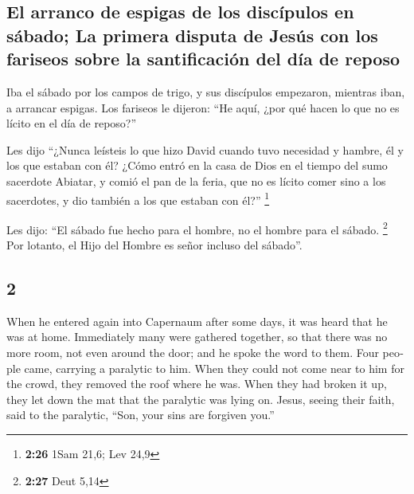 \begin{paracol}{2}
\hypertarget{el-arranco-de-espigas-de-los-discuxedpulos-en-suxe1bado-la-primera-disputa-de-jesuxfas-con-los-fariseos-sobre-la-santificaciuxf3n-del-duxeda-de-reposo}{%
\subsection{El arranco de espigas de los discípulos en sábado; La
primera disputa de Jesús con los fariseos sobre la santificación del día
de
reposo}\label{el-arranco-de-espigas-de-los-discuxedpulos-en-suxe1bado-la-primera-disputa-de-jesuxfas-con-los-fariseos-sobre-la-santificaciuxf3n-del-duxeda-de-reposo}}

 Iba el sábado por los campos de trigo, y sus discípulos
empezaron, mientras iban, a arrancar espigas.  Los
fariseos le dijeron: ``He aquí, ¿por qué hacen lo que no es lícito en el
día de reposo?''

 Les dijo ``¿Nunca leísteis lo que hizo David cuando tuvo
necesidad y hambre, él y los que estaban con él?  ¿Cómo
entró en la casa de Dios en el tiempo del sumo sacerdote Abiatar, y
comió el pan de la feria, que no es lícito comer sino a los sacerdotes,
y dio también a los que estaban con él?'' \footnote{\textbf{2:26} 1Sam
  21,6; Lev 24,9}

 Les dijo: ``El sábado fue hecho para el hombre, no el
hombre para el sábado. \footnote{\textbf{2:27} Deut 5,14}
 Por lotanto, el Hijo del Hombre es señor incluso del
sábado''.

\switchcolumn
\begin{otherlanguage}{english}

\hypertarget{section-3}{%
\section{2}\label{section-3}}

 When he entered again into Capernaum after some days, it
was heard that he was at home.  Immediately many were
gathered together, so that there was no more room, not even around the
door; and he spoke the word to them.  Four people came,
carrying a paralytic to him.  When they could not come
near to him for the crowd, they removed the roof where he was. When they
had broken it up, they let down the mat that the paralytic was lying on.
 Jesus, seeing their faith, said to the paralytic, ``Son,
your sins are forgiven you.''


\end{otherlanguage}
\end{paracol}
